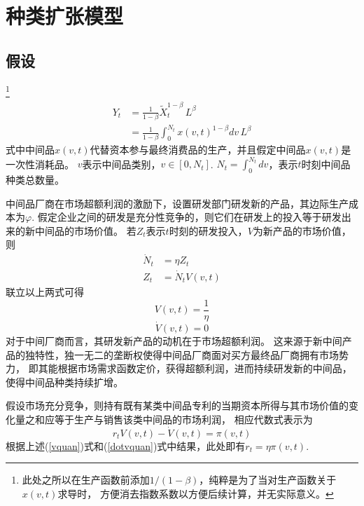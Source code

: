 \documentclass[cn,normal,11pt,black]{elegantnote}
\begin{document}
\section{种类扩张模型}

\subsection{假设}
\begin{definition}[最终品生产函数]
    \footnote{此处之所以在生产函数前添加$1/(1-\beta)$，纯粹是为了当对生产函数关于$x(v,t)$求导时，
        方便消去指数系数以方便后续计算，并无实际意义。}
    \begin{align}
        Y_{t} & = \frac{1}{1-\beta} \widetilde{X}_t^{1-\beta} \, L^\beta \\
              & = \frac{1}{1-\beta} \int_0^{N_t} x(v,t)^{1-\beta} dv \, L^\beta
    \end{align}  
    式中中间品$x(v,t)$代替资本参与最终消费品的生产，并且假定中间品$x(v,t)$是一次性消耗品。
    $v$表示中间品类别，$v \in [0,N_t]$.
    $N_t = \int_0^{N_t} dv$，表示$t$时刻中间品种类总数量。
\end{definition}

\begin{definition}[中间品厂商]  
    中间品厂商在市场超额利润的激励下，设置研发部门研发新的产品，其边际生产成本为$\varphi$.
    假定企业之间的研发是充分性竞争的，则它们在研发上的投入等于研发出来的新中间品的市场价值。
    若$Z_t$表示$t$时刻的研发投入，$V$为新产品的市场价值，则
    \begin{align}
       \dot{N}_t & = \eta Z_t \\
        Z_t & = \dot{N}_t V(v,t)
    \end{align}
    联立以上两式可得
    \begin{equation}\label{vquan}
       V(v,t) = \frac{1}{\eta} 
    \end{equation}
    \begin{equation}\label{dotvquan}
       \dot{V}(v,t) = 0 
    \end{equation}
    对于中间厂商而言，其研发新产品的动机在于市场超额利润。
    这来源于新中间产品的独特性，独一无二的垄断权使得中间品厂商面对买方最终品厂商拥有市场势力，
    即其能根据市场需求函数定价，获得超额利润，进而持续研发新的中间品，使得中间品种类持续扩增。
\end{definition}

\begin{definition}[市场无套利条件]
    假设市场充分竞争，则持有既有某类中间品专利的当期资本所得与其市场价值的变化量之和应等于生产与销售该类中间品的市场利润，
    相应代数式表示为
    \begin{equation}\label{noprofitquan}
      r_t V(v,t) - \dot{V}(v,t) = \pi(v,t)  
    \end{equation}
    根据上述(\ref{vquan})式和(\ref{dotvquan})式中结果，此处即有$r_t = \eta \pi(v,t)$.
\end{definition}
\end{document}
